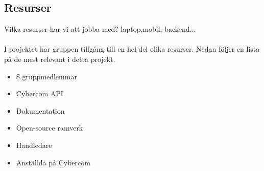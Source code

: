 \subsection{Resurser}
Vilka resurser har vi att jobba med?
laptop,mobil, backend...\\
\\
I projektet har gruppen tillgång till en hel del olika resurser. Nedan följer en lista på de mest relevant i detta projekt.\\
\begin{itemize}
\item 8 gruppmedlemmar
\item Cybercom API
\item Dokumentation
\item Open-source ramverk
\item Handledare
\item Anställda på Cybercom
\end{itemize}